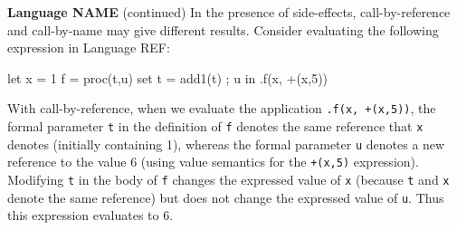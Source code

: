 \begin{minipage}[t]{\sw}
\slidenumber
\LARGE
{\bf Language NAME} (continued)\exx
In the presence of side-effects,
call-by-reference and call-by-name
may give different results.
Consider evaluating the following expression in Language REF:
{\Large
\begin{qv}
let
  x = 1
  f = proc(t,u)
        { set t = add1(t) ; u }
in
  .f(x, +(x,5))
\end{qv}
}
With call-by-reference,
when we evaluate the application \verb'.f(x, +(x,5))',
the formal parameter \verb't' in the definition of \verb'f' denotes
the same reference that \verb'x' denotes (initially containing 1),
whereas the formal parameter \verb'u' denotes a new reference
to the value 6 (using value semantics for the \verb'+(x,5)' expression).
Modifying \verb't' in the body of \verb'f' changes
the expressed value of \verb'x'
(because \verb't' and \verb'x' denote the same reference)
but does not change the expressed value of \verb'u'.
Thus this expression evaluates to 6.
\end{minipage}
\clearpage
